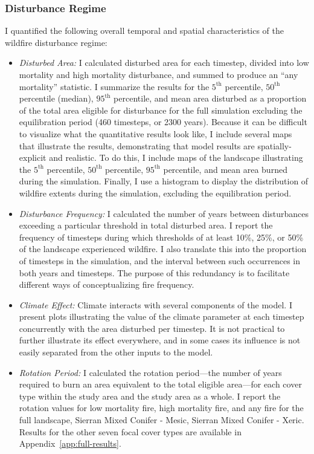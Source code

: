 \subsubsection*{Disturbance Regime} I quantified the following overall temporal and spatial characteristics of the wildfire disturbance regime:
\begin{itemize}
	\item \emph{Disturbed Area:} I calculated disturbed area for each timestep, divided into low mortality and high mortality disturbance, and summed to produce an ``any mortality'' statistic. I summarize the results for the $5^{\text{th}}$ percentile, $50^{\text{th}}$ percentile (median), $95^{\text{th}}$ percentile, and mean area disturbed as a proportion of the total area eligible for disturbance for the full simulation excluding the equilibration period (460 timesteps, or 2300 years). Because it can be difficult to visualize what the quantitative results look like, I include several maps that illustrate the results, demonstrating that model results are spatially-explicit and realistic. To do this, I include maps of the landscape illustrating the $5^{\text{th}}$ percentile, $50^{\text{th}}$ percentile, $95^{\text{th}}$ percentile, and mean area burned during the simulation. Finally, I use a histogram to display the distribution of wildfire extents during the simulation, excluding the equilibration period.
	\item \emph{Disturbance Frequency:} I calculated the number of years between disturbances exceeding a particular threshold in total disturbed area. I report the frequency of timesteps during which thresholds of at least 10\%, 25\%, or 50\% of the landscape experienced wildfire. I also translate this into the proportion of timesteps in the simulation, and the interval between such occurrences in both years and timesteps. The purpose of this redundancy is to facilitate different ways of conceptualizing fire frequency.
	\item \emph{Climate Effect:} Climate interacts with several components of the model. I present plots illustrating the value of the climate parameter at each timestep concurrently with the area disturbed per timestep. It is not practical to further illustrate its effect everywhere, and in some cases its influence is not easily separated from the other inputs to the model. 
	\item \emph{Rotation Period:} I calculated the rotation period---the number of years required to burn an area equivalent to the total eligible area---for each cover type within the study area and the study area as a whole. I report the rotation values for low mortality fire, high mortality fire, and any fire for the full landscape, Sierran Mixed Conifer - Mesic, Sierran Mixed Conifer - Xeric. Results for the other seven focal cover types are available in Appendix~\ref{app:full-results}.

\end{itemize}
